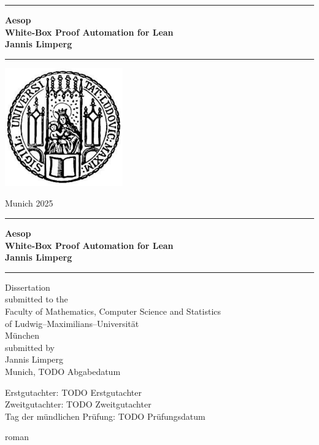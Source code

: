 \documentclass[12pt]{scrbook}
\newcommand{\LMUTitle}[9]{
  \thispagestyle{empty}
  \vspace*{\stretch{1}}
  {\parindent0cm
   \rule{\linewidth}{.7ex}}
  \begin{flushleft}

    \vspace*{\stretch{1}}
    \sffamily\bfseries\Huge
    #1\\
    \vspace*{\stretch{1}}
    \sffamily\bfseries\large
    #2
    \vspace*{\stretch{1}}
  \end{flushleft}
  \rule{\linewidth}{.7ex}
  \vspace*{\stretch{5}}
  \begin{center}
    \includegraphics[width=2in]{sigil}
  \end{center}
  \vspace*{\stretch{1}}
  \begin{center}\sffamily\LARGE{#4}\end{center}
  \newpage
  \thispagestyle{empty}

  \cleardoublepage
  \thispagestyle{empty}

  \vspace*{\stretch{1}}
  {\parindent0cm
  \rule{\linewidth}{.7ex}}
  \begin{flushleft}
    \vspace*{\stretch{1}}
    \sffamily\bfseries\Huge
    #1\\
    \vspace*{\stretch{1}}
    \sffamily\bfseries\large
    #2
    \vspace*{\stretch{1}}
  \end{flushleft}
  \rule{\linewidth}{.7ex}

  \vspace*{\stretch{3}}
  \begin{center}
    \Large Dissertation\\
    \Large submitted to the\\
    #3\\
    \Large of Ludwig--Maximilians--Universität\\
    \Large M\"unchen\\
    \vspace*{\stretch{1}}
    \Large submitted by\\
    \Large #2\\
    \vspace*{\stretch{2}}
    \Large Munich, #5
  \end{center}

  \newpage
  \thispagestyle{empty}

  \vspace*{\stretch{1}}

  \begin{flushleft}
    \large Erstgutachter:  #6 \\[1mm]
    \large Zweitgutachter: #7 \\[1mm]
    \large Tag der m\"undlichen Pr\"ufung: #8\\
  \end{flushleft}

  \cleardoublepage
}
\begin{document}
  \frontmatter
  \LMUTitle
      {Aesop\\White-Box Proof Automation for Lean}
      {Jannis Limperg}
      {Faculty of Mathematics, Computer Science and Statistics}
      {Munich 2025}
      {TODO Abgabedatum}
      {TODO Erstgutachter}
      {TODO Zweitgutachter}
      {TODO Prüfungsdatum}

  \pagenumbering{roman}
  \tableofcontents

  \mainmatter%

  
  \newpage
  
  \newpage
  
  \newpage
  
  \newpage
  

  \backmatter
  
  
\end{document}
